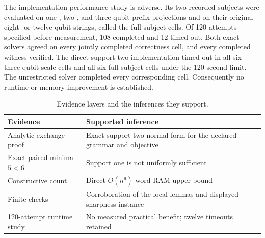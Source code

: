 The implementation-performance study is adverse. Its two recorded subjects were evaluated on one-, two-, and three-qubit prefix projections and on their original eight- or twelve-qubit strings, called the full-subject cells. Of 120 attempts specified before measurement, 108 completed and 12 timed out. Both exact solvers agreed on every jointly completed correctness cell, and every completed witness verified. The direct support-two implementation timed out in all six three-qubit scale cells and all six full-subject cells under the 120-second limit. The unrestricted solver completed every corresponding cell. Consequently no runtime or memory improvement is established.

\begin{table}[t]
\centering
\caption{Evidence layers and the inferences they support.}
\begin{tabularx}{\textwidth}{@{}l>{\raggedright\arraybackslash}X@{}}
\toprule
Evidence & Supported inference \\
\midrule
Analytic exchange proof & Exact support-two normal form for the declared grammar and objective \\
Exact paired minima $5<6$ & Support one is not uniformly sufficient \\
Constructive count & Direct $O(n^9)$ word-RAM upper bound \\
Finite checks & Corroboration of the local lemmas and displayed sharpness instance \\
120-attempt runtime study & No measured practical benefit; twelve timeouts retained \\
\bottomrule
\end{tabularx}
\end{table}
